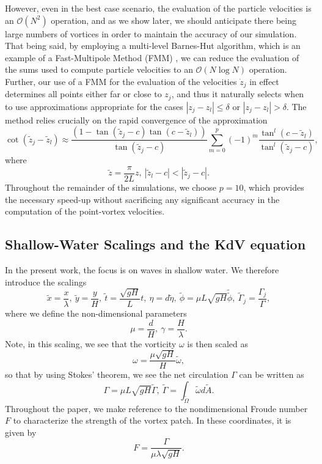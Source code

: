 \documentclass[a4paper,11pt]{article}
\begin{document}
However, even in the best case scenario, the evaluation of the particle velocities is an $\mathcal{O}(N^{2})$ operation, and as we show later, we should anticipate there being large numbers of vortices in order to maintain the accuracy of our simulation.  That being said, by employing a multi-level Barnes-Hut algorithm, which is an example of a Fast-Multipole Method (FMM) \cite{greengard}, we can reduce the evaluation of the sums used to compute particle velocities to an $\mathcal{O}(N\log N)$ operation.  Further, our use of a FMM for the evaluation of the velocities $\dot{z}_{j}$ in effect determines all points either far or close to $z_{j}$, and thus it naturally selects when to use approximations appropriate for the cases  $|z_{j}-z_{l}|\leq\delta$ or $|z_{j}-z_{l}|>\delta$.  The method relies crucially on the rapid convergence of the approximation
\[
\cot\left(\tilde{z}_{j}-\tilde{z}_{l} \right) \approx \frac{\left(1-\tan(\tilde{z}_{j}-c)\tan(c-\tilde{z}_{l})\right)}{\tan\left(\tilde{z}_{j}-c\right)}\sum_{m=0}^{p}(-1)^{m}\frac{\tan^{l}\left(c-\tilde{z}_{l}\right)}{\tan^{l}\left(\tilde{z}_{j}-c\right)}, 
\]   
where
\[
\tilde{z} = \frac{\pi}{2L}z, ~ \left|\tilde{z}_{l}-c\right|<\left|\tilde{z}_{j}-c\right|.
\]
Throughout the remainder of the simulations, we choose $p=10$, which provides the necessary speed-up without sacrificing any significant accuracy in the computation of the point-vortex velocities.  
\subsection*{Shallow-Water Scalings and the KdV equation}
In the present work, the focus is on waves in shallow water.  We therefore introduce the scalings 
\[
\tilde{x} = \frac{x}{\lambda}, ~\tilde{y} = \frac{y}{H}, ~ \tilde{t} = \frac{\sqrt{gH}}{L} t, ~ \eta = d\tilde{\eta}, ~ \tilde{\phi} = \mu L\sqrt{gH} \tilde{\tilde{\phi}}, ~ \tilde{\Gamma}_{j} = \frac{\Gamma_{j}}{\Gamma},
\]
where we define the non-dimensional parameters
\[
\mu= \frac{d}{H}, ~ \gamma = \frac{H}{\lambda}.  
\]
Note, in this scaling, we see that the vorticity $\omega$ is then scaled as 
\[
\omega = \frac{\mu \sqrt{gH}}{H}\tilde{\omega},
\]
so that by using Stokes' theorem, we see the net circulation $\Gamma$ can be written as 
\[
\Gamma = \mu L \sqrt{gH} \tilde{\Gamma}, ~ \tilde{\Gamma} = \int_{ \tilde{\Omega} } \tilde{\omega} d\tilde{A}.
\]
Throughout the paper, we make reference to the nondimensional Froude number $F$ to characterize the strength of the vortex patch.  In these coordinates, it is given by 
\[
F = \frac{\Gamma}{\mu \lambda \sqrt{gH}}.
\]
\end{document}
